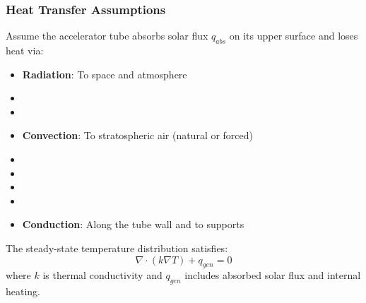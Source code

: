 {{{{\subsubsection{Heat Transfer Assumptions}
Assume the accelerator tube absorbs solar flux $q_{abs}$ on its upper surface and loses heat via:
\begin{itemize}
    \item \textbf{Radiation}: To space and atmosphere
    \item \item \item \textbf{Convection}: To stratospheric air (natural or forced)
    \item \item \item \item \item \textbf{Conduction}: Along the tube wall and to supports
\end{itemize}
The steady-state temperature distribution satisfies:
\begin{equation}
\nabla \cdot (k \nabla T) + q_{gen} = 0
\end{equation}
where $k$ is thermal conductivity and $q_{gen}$ includes absorbed solar flux and internal heating.

}}}}
